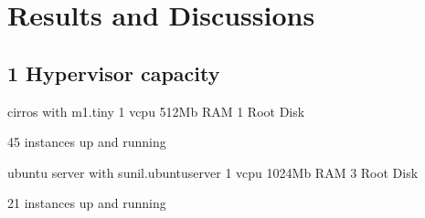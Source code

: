\chapter{Results and Discussions}
\section{1 Hypervisor capacity}

cirros with m1.tiny 1 vcpu 512Mb RAM 1 Root Disk

45 instances up and running

ubuntu server with sunil.ubuntuserver 1 vcpu 1024Mb RAM 3 Root Disk

21 instances up and running
